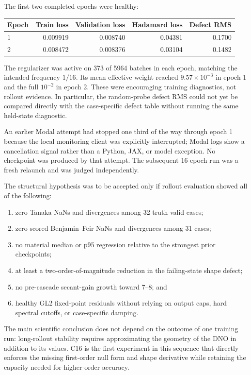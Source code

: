 \documentclass[11pt]{article}
\begin{document}
The first two completed epochs were healthy:
\begin{center}
\begin{tabular}{lrrrr}
\toprule
Epoch & Train loss & Validation loss & Hadamard loss & Defect RMS \\
\midrule
1 & 0.009919 & 0.008740 & 0.04381 & 0.1700 \\
2 & 0.008472 & 0.008376 & 0.03104 & 0.1482 \\
\bottomrule
\end{tabular}
\end{center}
The regularizer was active on 373 of 5964 batches in each epoch, matching the
intended frequency \(1/16\).  Its mean effective weight reached
\(9.57\times10^{-3}\) in epoch 1 and the full \(10^{-2}\) in epoch 2.  These
were encouraging training diagnostics, not rollout evidence.  In particular,
the random-probe defect RMS could not yet be compared directly with the
case-specific defect table without running the same held-state diagnostic.

An earlier Modal attempt had stopped one third of the way through epoch 1 because
the local monitoring client was explicitly interrupted; Modal logs show a
cancellation signal rather than a Python, JAX, or model exception.  No
checkpoint was produced by that attempt.  The subsequent 16-epoch run was a
fresh relaunch and was judged independently.

The structural hypothesis was to be accepted only if rollout evaluation showed
all of the following:
\begin{enumerate}
  \item zero Tanaka NaNs and divergences among 32 truth-valid cases;
  \item zero scored Benjamin--Feir NaNs and divergences among 31 cases;
  \item no material median or p95 regression relative to the strongest prior
        checkpoints;
  \item at least a two-order-of-magnitude reduction in the failing-state shape
        defect;
  \item no pre-cascade secant-gain growth toward 7--8; and
  \item healthy GL2 fixed-point residuals without relying on output caps,
        hard spectral cutoffs, or case-specific damping.
\end{enumerate}

The main scientific conclusion does not depend on the outcome of one training
run: long-rollout stability requires approximating the geometry of the DNO in
addition to its values.  C16 is the first experiment in this sequence that
directly enforces the missing first-order null form and shape derivative while
retaining the capacity needed for higher-order accuracy.
\end{document}
